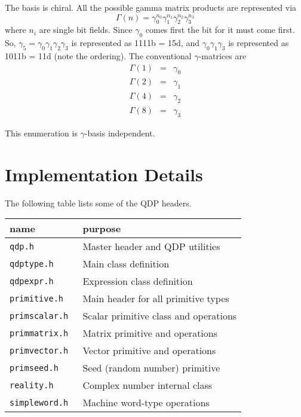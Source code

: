 \documentclass[12pt,letterpaper]{article}
\begin{document}
%
The basis is chiral. All the possible gamma matrix products are
represented via
\[
\Gamma(n) = \gamma_0^{n_0} \gamma_1^{n_1} \gamma_2^{n_2} \gamma_3^{n_3}
\]
%
where $n_i$ are single bit fields.  Since $\gamma_0$ comes first the
bit for it must come first. %
So, $\gamma_5 = \gamma_0\gamma_1\gamma_2\gamma_3$ 
is represented as 1111b = 15d, and 
$\gamma_0\gamma_1\gamma_3$ is represented as 1011b = 11d
(note the ordering). The conventional $\gamma$-matrices are
\begin{eqnarray}
\Gamma(1) &=& \gamma_0\nonumber\\
\Gamma(2) &=& \gamma_1\nonumber\\
\Gamma(4) &=& \gamma_2\nonumber\\
\Gamma(8) &=& \gamma_3\nonumber
\end{eqnarray}

This enumeration is $\gamma$-basis independent.


\newpage

\section{Implementation Details}
\label{sec:implementation}

The following table lists some of the QDP headers.
\begin{center}
\begin{tabular}{|l|l|}
\hline
 name & purpose \\
\hline
 {\tt qdp.h        } & Master header and QDP utilities     \\
 {\tt qdptype.h    } & Main class definition               \\
 {\tt qdpexpr.h    } & Expression class definition         \\
 {\tt primitive.h  } & Main header for all primitive types \\
 {\tt primscalar.h } & Scalar primitive class and operations \\
 {\tt primmatrix.h } & Matrix primitive and operations \\
 {\tt primvector.h } & Vector primitive and operations \\
 {\tt primseed.h   } & Seed (random number) primitive  \\
 {\tt reality.h    } & Complex number internal class  \\
 {\tt simpleword.h } & Machine word-type operations  \\
\hline
\end{tabular}
\end{center}
\end{document}
